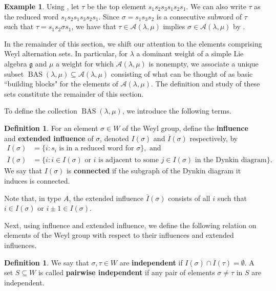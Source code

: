 \documentclass{amsart}
\theoremstyle{definition}
\newtheorem{definition}[theorem]{Definition}
\newtheorem{example}[theorem]{Example}
\DeclareMathOperator{\BAS}{BAS}
\newcommand{\calA}{\mathcal{A}}
\newcommand{\defn}[1]{\textbf{#1}}
\begin{document}
\begin{example}
    Using , let $\tau$ be the top element $s_1s_2s_3s_1s_2s_1$. We can also write $\tau$ as the reduced word $s_1s_2s_1s_3s_2s_1$. Since $\sigma=s_1s_3s_2$ is a consecutive subword of $\tau$ such that $\tau=s_1s_2\sigma s_1$, we have that $\tau\in\calA(\lambda,\mu)$ implies $\sigma\in \calA(\lambda,\mu)$ by .
\end{example}

In the remainder of this section, we shift our attention to the elements comprising Weyl alternation sets. In particular, for $\lambda$ a dominant weight of a simple Lie algebra $\mathfrak{g}$ and $\mu$ a weight for which $\mathcal{A}(\lambda,\mu)$ is nonempty, we associate a unique subset $\BAS(\lambda,\mu)\subseteq \mathcal{A}(\lambda,\mu)$ consisting of what can be thought of as basic ``building blocks" for the elements of $\mathcal{A}(\lambda,\mu)$. The definition and study of these sets constitute the remainder of this section.

To define the collection $\BAS(\lambda,\mu)$, we introduce the following terms.

\begin{definition}\label{def:ind}
For an element $\sigma\in W$ of the Weyl group, define the \defn{influence} and \defn{extended influence} of $\sigma$, denoted $I(\sigma)$ and $\overline{I}(\sigma)$ respectively, by \begin{align*}
    I(\sigma)&=\{i:\text{$s_i$ is in a reduced word for $\sigma$}\},\mbox{ and}\\
    \overline{I}(\sigma)&=\{i:i\in I(\sigma)\text{ or $i$ is adjacent to some $j\in I(\sigma)$ in the Dynkin diagram}\}.
\end{align*}
We say that $I(\sigma)$ is \defn{connected} if the subgraph of the Dynkin diagram it induces is connected. 
\end{definition}

Note that, in type $A$, the extended influence $\overline{I}(\sigma)$ consists of all $i$ such that $i\in I(\sigma)$ or $i\pm1\in I(\sigma)$.

Next, using influence and extended influence, we define the following relation on elements of the Weyl group with respect to their influences and extended influences.

\begin{definition}  \label{def:independence} We say that $\sigma, \tau\in W$ are \defn{independent} if $I(\sigma)\cap\overline{I}(\tau)=\emptyset$. A set $S\subseteq W$ is called \defn{pairwise independent} if any pair of elements $\sigma\neq\tau$ in $S$ are independent.
\end{definition}
\end{document}
